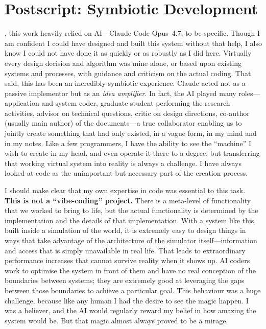\documentclass[nobib]{tufte-handout}
\begin{document}
\clearpage

\section*{Postscript: Symbiotic Development}

, this work heavily relied on AI---Claude Code Opus~4.7, to be specific. Though I am confident I could have designed and built this system without that help, I also know I could not have done it as quickly or as robustly as I did here. Virtually every design decision and algorithm was mine alone, or based upon existing systems and processes, with guidance and criticism on the actual coding. That said, this has been an incredibly symbiotic experience. Claude acted not as a passive implementor but as an \emph{idea amplifier}. In fact, the AI played many roles---application and system coder, graduate student performing the research activities, advisor on technical questions, critic on design directions, co-author (usually main author) of the documents---a true collaborator enabling us to jointly create something that had only existed, in a vague form, in my mind and in my notes. Like a few programmers, I have the ability to see the ``machine'' I wish to create in my head, and even operate it there to a degree; but transferring that working virtual system into reality is always a challenge. I have always looked at code as the unimportant-but-necessary part of the creation process.

I should make clear that my own expertise in code was essential to this task. \textbf{This is not a ``vibe-coding'' project.} There is a meta-level of functionality that we worked to bring to life, but the actual functionality is determined by the implementation and the details of that implementation. With a system like this, built inside a simulation of the world, it is extremely easy to design things in ways that take advantage of the architecture of the simulator itself---information and access that is simply unavailable in real life. That leads to extraordinary performance increases that cannot survive reality when it shows up. AI coders work to optimise the system in front of them and have no real conception of the boundaries between systems; they are extremely good at leveraging the gaps between those boundaries to achieve a particular goal. This behaviour was a huge challenge, because like any human I had the desire to see the magic happen. I was a believer, and the AI would regularly reward my belief in how amazing the system would be. But that magic almost always proved to be a mirage.
\end{document}
